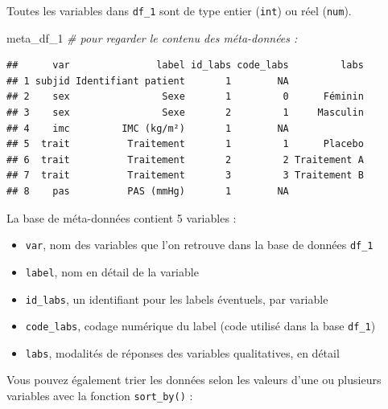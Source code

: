 \documentclass[
]{book}
\newenvironment{Shaded}{\begin{snugshade}}{\end{snugshade}}
\newcommand{\AttributeTok}[1]{\textcolor[rgb]{0.13,0.29,0.53}{#1}}
\newcommand{\CommentTok}[1]{\textcolor[rgb]{0.56,0.35,0.01}{\textit{#1}}}
\newcommand{\DocumentationTok}[1]{\textcolor[rgb]{0.56,0.35,0.01}{\textbf{\textit{#1}}}}
\newcommand{\FunctionTok}[1]{\textcolor[rgb]{0.13,0.29,0.53}{\textbf{#1}}}
\newcommand{\NormalTok}[1]{#1}
\newcommand{\SpecialCharTok}[1]{\textcolor[rgb]{0.81,0.36,0.00}{\textbf{#1}}}
\providecommand{\tightlist}{%
  \setlength{\itemsep}{0pt}\setlength{\parskip}{0pt}}
\begin{document}
Toutes les variables dans \texttt{df\_1} sont de type entier (\texttt{int}) ou réel (\texttt{num}).

\begin{Shaded}
\begin{Highlighting}[]
\NormalTok{meta\_df\_1 }\CommentTok{\# pour regarder le contenu des méta{-}données : }
\end{Highlighting}
\end{Shaded}

\begin{verbatim}
##      var               label id_labs code_labs         labs
## 1 subjid Identifiant patient       1        NA             
## 2    sex                Sexe       1         0      Féminin
## 3    sex                Sexe       2         1     Masculin
## 4    imc         IMC (kg/m²)       1        NA             
## 5  trait          Traitement       1         1      Placebo
## 6  trait          Traitement       2         2 Traitement A
## 7  trait          Traitement       3         3 Traitement B
## 8    pas          PAS (mmHg)       1        NA
\end{verbatim}

La base de méta-données contient 5 variables :

\begin{itemize}
\tightlist
\item
  \texttt{var}, nom des variables que l'on retrouve dans la base de données \texttt{df\_1}
\item
  \texttt{label}, nom en détail de la variable\\
\item
  \texttt{id\_labs}, un identifiant pour les labels éventuels, par variable
\item
  \texttt{code\_labs}, codage numérique du label (code utilisé dans la base \texttt{df\_1})
\item
  \texttt{labs}, modalités de réponses des variables qualitatives, en détail
\end{itemize}

Vous pouvez également trier les données selon les valeurs d'une ou plusieurs variables avec la fonction \texttt{sort\_by()} :

\begin{Shaded}
\end{Shaded}
\end{document}
